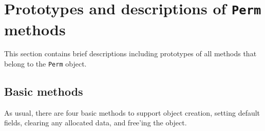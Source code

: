 \par
\section{Prototypes and descriptions of {\tt Perm} methods}
\label{section:Perm:proto}
\par
This section contains brief descriptions including prototypes
of all methods that belong to the {\tt Perm} object.
\par
\subsection{Basic methods}
\label{subsection:Perm:proto:basics}
\par
As usual, there are four basic methods to support object creation,
setting default fields, clearing any allocated data, and free'ing
the object.
\par

